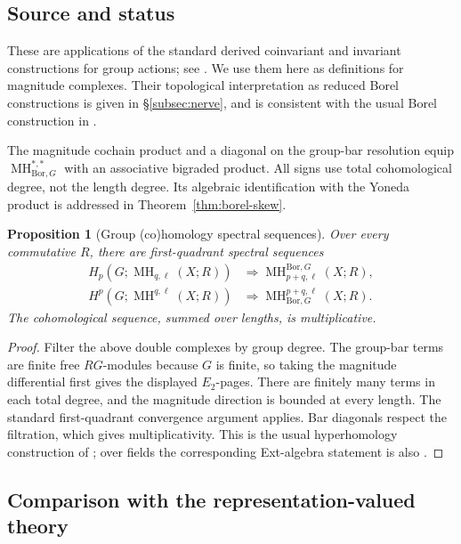 \documentclass[11pt,a4paper]{article}
\numberwithin{equation}{section}
\newtheorem{proposition}[theorem]{Proposition}
\theoremstyle{definition}
\theoremstyle{remark}
\newcommand{\G}{G}
\newcommand{\MH}{\operatorname{MH}}
\newcommand{\Bor}{\mathrm{Bor}}
\newcommand{\source}{\subsection*{\color{darkblue}Source and status}}
\begin{document}
\source These are applications of the standard derived coinvariant
and invariant constructions for group actions; see \cite[Chs.~I, III,
VII]{Brown}.  We use them here as definitions for magnitude complexes.
Their topological interpretation as reduced Borel constructions is
given in \S\ref{subsec:nerve}, and is consistent with the usual Borel
construction in \cite[\S2.1.4]{Guillou}.

The magnitude cochain product and a diagonal on the group-bar
resolution equip $\MH^{*,*}_{\Bor,\G}$ with an associative bigraded
product.  All signs use total cohomological degree, not the length
degree.  Its algebraic identification with the Yoneda product is
addressed in Theorem~\ref{thm:borel-skew}.

\begin{proposition}[Group (co)homology spectral sequences]
\label{prop:borel-ss}
 Over every commutative $R$, there are first-quadrant spectral sequences
 \begin{align}
 H_p(\G;\MH_{q,\ell}(X;R))
   &\Longrightarrow\MH^{\Bor,\G}_{p+q,\ell}(X;R),\label{eq:hom-ss}\\
 H^p(\G;\MH^{q,\ell}(X;R))
   &\Longrightarrow\MH^{p+q,\ell}_{\Bor,\G}(X;R).\label{eq:cohom-ss}
 \end{align}
 The cohomological sequence, summed over lengths, is multiplicative.
\end{proposition}
\begin{proof}
Filter the above double complexes by group degree.  The group-bar
terms are finite free $R\G$-modules because $\G$ is finite, so taking
the magnitude differential first gives the displayed $E_2$-pages.
There are finitely many terms in each total degree, and the magnitude
direction is bounded at every length.  The standard first-quadrant
convergence argument applies.  Bar diagonals respect the filtration,
which gives multiplicativity.  This is the usual hyperhomology
construction of \cite[Ch.~VII]{Brown}; over fields the corresponding
Ext-algebra statement is also \cite[Corollary 7.7]{Negron}.
\end{proof}

\subsection{Comparison with the representation-valued theory}
\end{document}
